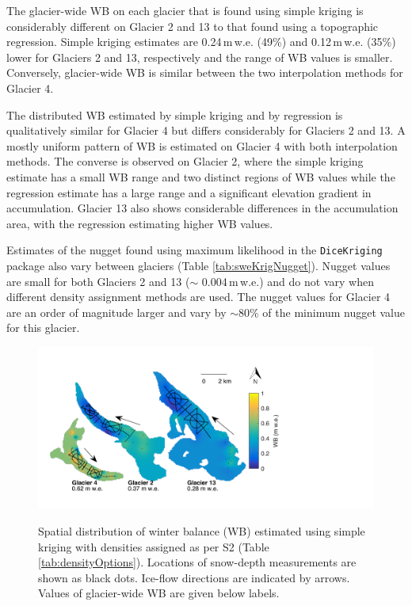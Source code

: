 \documentclass{sfuthesis}
\begin{document}
The glacier-wide WB on each glacier that is found using simple kriging is considerably different on Glacier 2 and 13 to that found using a topographic regression. Simple kriging estimates are 0.24\,m\,w.e. (49\%) and 0.12\,m\,w.e. (35\%) lower for Glaciers 2 and 13, respectively and the range of WB values is smaller. Conversely, glacier-wide WB is similar between the two interpolation methods for Glacier 4.

The distributed WB estimated by simple kriging and by regression is qualitatively similar for Glacier 4 but differs considerably for Glaciers 2 and 13. A mostly uniform pattern of WB is estimated on Glacier 4 with both interpolation methods. The converse is observed on Glacier 2, where the simple kriging estimate has a small WB range and two distinct regions of WB values while the regression estimate has a large range and a significant elevation gradient in accumulation. Glacier 13 also shows considerable differences in the accumulation area, with the regression estimating higher WB values. 

Estimates of the nugget found using maximum likelihood in the \texttt{DiceKriging} package also vary between glaciers (Table \ref{tab:sweKrigNugget}). Nugget values are small for both Glaciers 2 and 13 ($\sim$ 0.004\,m\,w.e.) and do not vary when different density assignment methods are used. The nugget values for Glacier 4 are an order of magnitude larger and vary by $\sim$80\% of the minimum nugget value for this glacier. 

\begin{figure}
	\centering
	\includegraphics[width =0.9 \textwidth]{SK_map.pdf}\\
	\caption{Spatial distribution of winter balance (WB) estimated using simple kriging with densities assigned as per S2 (Table \ref{tab:densityOptions}). Locations of snow-depth measurements are shown as black dots. Ice-flow directions are indicated by arrows. Values of glacier-wide WB are given below labels.}
	\label{fig:sweKRIGING}
\end{figure}
\end{document}
